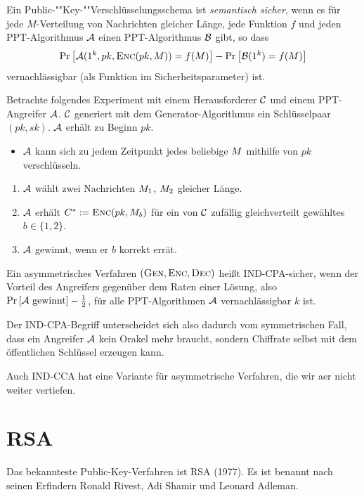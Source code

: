 \begin{definition}
Ein Pub\-lic-""Key-""Ver\-schlüs\-sel\-ungs\-sche\-ma ist \textit{semantisch sicher}, wenn es für jede $M$-Verteilung von Nachrichten gleicher Länge, jede
Funktion $f$ und jeden PPT-Algorithmus $\mathcal{A}$ einen PPT-Algorithmus $\mathcal{B}$ gibt, so dass
\begin{equation*}
\Pr\left[\mathcal{A}(1^k, pk, \textsc{Enc}(pk, M)) = f(M)\right] - \Pr\left[\mathcal{B}(1^k) = f(M)\right]
\end{equation*}
vernachlässigbar (als Funktion im Sicherheitsparameter) ist.
\end{definition}

\begin{definition}
  Betrachte folgendes Experiment mit einem Herausforderer $\mathcal{C}$ und einem
  PPT-Angreifer $\mathcal{A}$. $\mathcal{C}$ generiert mit dem Generator-Algorithmus ein
  Schlüsselpaar $(pk, sk)$. $\mathcal{A}$ erhält zu Beginn $pk$.
  \begin{itemize}
  \item $\mathcal{A}$ kann sich zu jedem Zeitpunkt jedes beliebige $M$
    mithilfe von $pk$ verschlüsseln.
  \end{itemize}
  \begin{enumerate}
  \item $\mathcal{A}$ wählt zwei Nachrichten $M_1$, $M_2$ gleicher
    Länge.
  \item $\mathcal{A}$ erhält $C^{*} := \textsc{Enc}(pk, M_{b})$ für ein von
    $\mathcal{C}$ zufällig gleichverteilt gewähltes $b \in \{1, 2\}$.
  \item $\mathcal{A}$ gewinnt, wenn er $b$ korrekt errät.
  \end{enumerate} 
  Ein asymmetrisches Verfahren $(\textsc{Gen}, \textsc{Enc}, \textsc{Dec})$ heißt IND-CPA-sicher, wenn der Vorteil des
  Angreifers gegenüber dem Raten einer Lösung, also $\Pr \left[ \mathcal{A}
    \textnormal{ gewinnt} \right] - \frac{1}{2}$, für alle
  PPT-Algorithmen $\mathcal{A}$ vernachlässigbar $k$ ist.
\end{definition}

Der IND-CPA-Begriff unterscheidet sich also dadurch vom symmetrischen
Fall, dass ein Angreifer $\mathcal{A}$ kein Orakel mehr braucht, sondern
Chiffrate selbst mit dem öffentlichen Schlüssel erzeugen kann.

Auch IND-CCA hat eine Variante für asymmetrische Verfahren, die wir aer
nicht weiter vertiefen.

\section{RSA}
Das bekannteste Public-Key-Verfahren ist RSA (1977). Es ist benannt nach seinen
Erfindern Ronald Rivest, Adi Shamir und Leonard Adleman.


